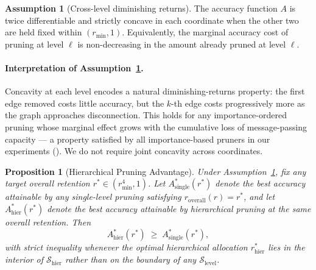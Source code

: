 \documentclass[10pt]{article}
\theoremstyle{plain}
\newtheorem{proposition}{Proposition}
\theoremstyle{definition}
\newtheorem{assumption}{Assumption}
\begin{document}
\begin{assumption}[Cross-level diminishing returns]
\label{assump:concave}
The accuracy function $A$ is twice differentiable and strictly
concave in each coordinate when the other two are held fixed
within $(r_{\min},1)$. Equivalently, the marginal accuracy cost
of pruning at level $\ell$ is non-decreasing in the amount
already pruned at level $\ell$.
\end{assumption}

\paragraph{Interpretation of Assumption~\ref{assump:concave}.}
Concavity at each level encodes a natural diminishing-returns
property: the first edge removed costs little accuracy, but the
$k$-th edge costs progressively more as the graph approaches
disconnection. This holds for any importance-ordered pruning whose
marginal effect grows with the cumulative loss of message-passing
capacity --- a property satisfied by all importance-based pruners
in our experiments
(\citealp{cai2022hypergraph,lin2024filter,zhang2024graph}). We do
not require joint concavity across coordinates.

\begin{proposition}[Hierarchical Pruning Advantage]
\label{prop:hierarchical}
Under Assumption~\ref{assump:concave}, fix any target overall
retention $r^{\!*}\in(r_{\min}^{4},1)$. Let
$A_{\mathrm{single}}^{\!*}(r^{\!*})$ denote the best accuracy
attainable by any single-level pruning satisfying
$r_{\mathrm{overall}}(r) = r^{\!*}$, and let
$A_{\mathrm{hier}}^{\!*}(r^{\!*})$ denote the best accuracy
attainable by hierarchical pruning at the same overall retention.
Then
\begin{equation}
A_{\mathrm{hier}}^{\!*}(r^{\!*}) \;\ge\;
A_{\mathrm{single}}^{\!*}(r^{\!*}),
\label{eq:hier_ge}
\end{equation}
with \emph{strict} inequality whenever the optimal hierarchical
allocation $r^{\!*}_{\mathrm{hier}}$ lies in the interior of
$\mathcal{S}_{\mathrm{hier}}$ rather than on the boundary of any
$\mathcal{S}_{\mathrm{level}}$.
\end{proposition}
\end{document}
